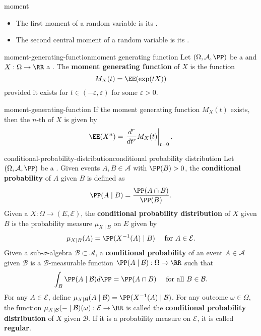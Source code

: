 \begin{example}{moment}
    \begin{itemize}
        \item The first moment of a random variable is its .
        \item The second central moment of a random variable is its .
    \end{itemize}
\end{example}

\begin{topic}{moment-generating-function}{moment generating function}
    Let $(\Omega, \mathcal{A}, \PP)$ be a  and $X : \Omega \to \RR$ a . The \textbf{moment generating function} of $X$ is the function
    \[ M_X(t) = \EE(\exp(t X)) \]
    provided it exists for $t \in (-\varepsilon, \varepsilon)$ for some $\varepsilon > 0$.
\end{topic}

\begin{example}{moment-generating-function}
    If the moment generating function $M_X(t)$ exists, then the $n$-th  of $X$ is given by 
    \[ \EE(X^n) = \left. \frac{d^r}{dt^r} M_X(t) \right|_{t = 0} . \]
\end{example}

\begin{topic}{conditional-probability-distribution}{conditional probability distribution}
    Let $(\Omega, \mathcal{A}, \PP)$ be a . Given events $A, B \in \mathcal{A}$ with $\PP(B) > 0$, the \textbf{conditional probability} of $A$ given $B$ is defined as
    \[ \PP(A \mid B) = \frac{\PP(A \cap B)}{\PP(B)} . \]
    Given a  $X : \Omega \to (E, \mathcal{E})$, the \textbf{conditional probability distribution} of $X$ given $B$ is the probability measure $\mu_{X \mid B}$ on $E$ given by
    \[ \mu_{X \mid B}(A) = \PP(X^{-1}(A) \mid B) \quad \textup{ for } A \in \mathcal{E} . \]
    Given a sub-$\sigma$-algebra $\mathcal{B} \subset \mathcal{A}$, a \textbf{conditional probability} of an event $A \in \mathcal{A}$ given $\mathcal{B}$ is a $\mathcal{B}$-measurable function $\PP(A \mid \mathcal{B}) : \Omega \to \RR$ such that
    \[ \int_B \PP(A \mid \mathcal{B}) d \PP = \PP(A \cap B) \quad \textup{ for all } B \in \mathcal{B} . \]
    For any $A \in \mathcal{E}$, define $\mu_{X \mid \mathcal{B}}(A \mid \mathcal{B}) = \PP(X^{-1}(A) \mid \mathcal{B})$. For any outcome $\omega \in \Omega$, the function $\mu_{X \mid \mathcal{B}}(- \mid \mathcal{B})(\omega) : \mathcal{E} \to \RR$ is called the \textbf{conditional probability distribution} of $X$ given $\mathcal{B}$. If it is a probability measure on $\mathcal{E}$, it is called \textbf{regular}.
\end{topic}
